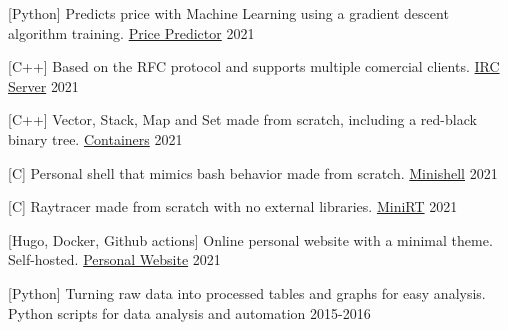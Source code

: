 
\begin{cventries}

  \cventry
    {[Python] Predicts price with Machine Learning using a gradient descent algorithm training.}
    {\href{https://github.com/pruiz-ca/ft_linear_regression}{Price Predictor}}
    {}
    {2021}
    {}

  \cventry
    {[C++] Based on the RFC protocol and supports multiple comercial clients.}
    {\href{https://github.com/pruiz-ca/ft_irc}{IRC Server}}
    {}
    {2021}
    {}

  \cventry
    {[C++] Vector, Stack, Map and Set made from scratch, including a red-black binary tree.}
    {\href{https://github.com/pruiz-ca/ft_containers}{Containers}}
    {}
    {2021}
    {}

  \cventry
    {[C] Personal shell that mimics bash behavior made from scratch.}
    {\href{https://github.com/pruiz-ca/minishell}{Minishell}}
    {}
    {2021}
    {}

  \cventry
    {[C] Raytracer made from scratch with no external libraries.}
    {\href{https://github.com/pruiz-ca/miniRT}{MiniRT}}
    {}
    {2021}
    {}

  \cventry
    {[Hugo, Docker, Github actions] Online personal website with a minimal theme. Self-hosted.}
    {\href{https://github.com/pruiz-ca/pedroruiz.xyz}{Personal Website}}
    {}
    {2021}
    {}

  \cventry
    {[Python] Turning raw data into processed tables and graphs for easy analysis.}
    {Python scripts for data analysis and automation}
    {}
    {2015-2016}
    {}

\end{cventries}
